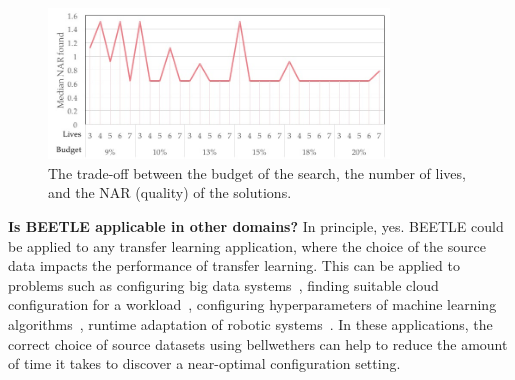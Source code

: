 \documentclass[10pt,journal,compsoc]{IEEEtran}
\begin{document}



\begin{figure}[t]
    \centering
    \includegraphics[width=0.98\linewidth, height=4cm]{figures/ParamTuning.jpg}
    \caption{The trade-off between the budget of the search, the number of lives, and the NAR (quality) of the solutions.}
    \label{fig:tuning}
\end{figure}


\noindent\textbf{Is BEETLE applicable in other domains?} In principle, yes. BEETLE could be applied to any transfer learning application, where the choice of the source data impacts the performance of transfer learning. This can be applied to problems such as configuring big data systems~\cite{JC:MASCOTS16}, finding suitable cloud configuration for a workload~\cite{Hsu2018scout, hsu2017low}, 
configuring hyperparameters of machine learning algorithms~\cite{fu2016tuning, fu2016differential, afridi2018}, runtime adaptation of robotic systems~\cite{jamshidi2017transfer}. In these applications, the correct choice of source datasets using bellwethers can help to reduce the amount of time it takes to discover a near-optimal configuration setting.
\end{document}
